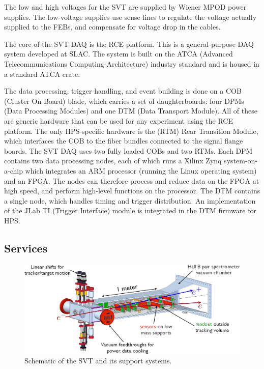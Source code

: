 The low and high voltages for the SVT are supplied by Wiener MPOD power supplies.
The low-voltage supplies use sense lines to regulate the voltage actually supplied to the FEBs, and compensate for voltage drop in the cables.

The core of the SVT DAQ is the RCE platform.
This is a general-purpose DAQ system developed at SLAC.
The system is built on the ATCA (Advanced Telecommunications Computing Architecture) industry standard and is housed in a standard ATCA crate.

The data processing, trigger handling, and event building is done on a COB (Cluster On Board) blade, which carries a set of daughterboards: four DPMs (Data Processing Modules) and one DTM (Data Transport Module).
All of these are generic hardware that can be used for any experiment using the RCE platform.
The only HPS-specific hardware is the (RTM) Rear Transition Module, which interfaces the COB to the fiber bundles connected to the signal flange boards.
The SVT DAQ uses two fully loaded COBs and two RTMs.
Each DPM contains two data processing nodes, each of which runs a Xilinx Zynq system-on-a-chip which integrates an ARM processor (running the Linux operating system) and an FPGA.
The nodes can therefore process and reduce data on the FPGA at high speed, and perform high-level functions on the processor.
The DTM contains a single node, which handles timing and trigger distribution.
An implementation of the JLab TI (Trigger Interface) module is integrated in the DTM firmware for HPS.

\subsection{Services}


\begin{figure}[ht]
    \includegraphics[width=\textwidth]{detector/figs/svt_cutaway}
    \caption{Schematic of the SVT and its support systems.}
    \label{fig:svt-schematic}
\end{figure}

